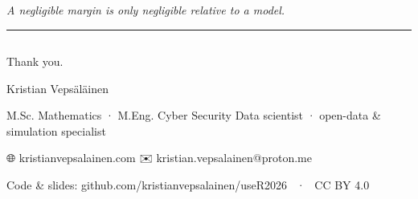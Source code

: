 \documentclass[
  letterpaper,
  DIV=11,
  numbers=noendperiod]{scrartcl}
\begin{document}
\emph{A negligible margin is only negligible relative to a model.}

\begin{center}\rule{0.5\linewidth}{0.5pt}\end{center}

\subsection{}\label{section-1}

Thank you.

Kristian Vepsäläinen

M.Sc. Mathematics · M.Eng. Cyber Security Data scientist · open-data \&
simulation specialist

🌐 kristianvepsalainen.com ✉️ kristian.vepsalainen@proton.me

Code \& slides: github.com/kristianvepsalainen/useR2026 ~·~ CC BY 4.0
\end{document}
